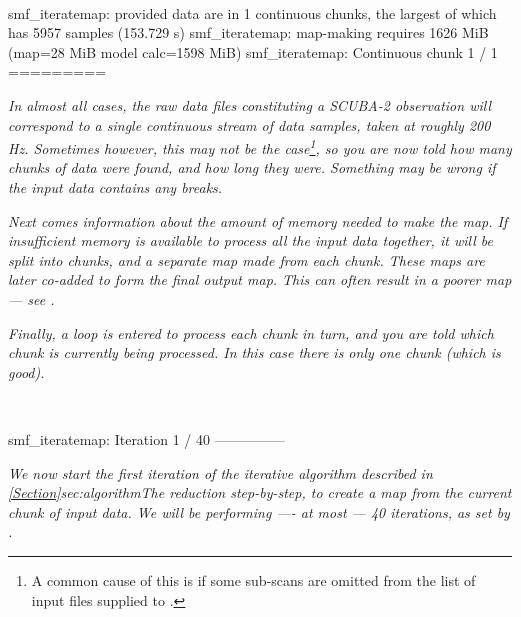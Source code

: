 ~
\begin{terminalv}
smf_iteratemap: provided data are in 1 continuous chunks, the largest of which
has 5957 samples (153.729 s)
smf_iteratemap: map-making requires 1626 MiB (map=28 MiB model calc=1598 MiB)
smf_iteratemap: Continuous chunk 1 / 1 =========
\end{terminalv}

\emph{In almost all cases, the raw data files constituting a SCUBA-2
observation will correspond to a single continuous stream of data
samples, taken at roughly 200 Hz. Sometimes however, this may not be the
case\footnote{A common cause of this is if some sub-scans are omitted
from the list of input files supplied to .}, so you are
now told how many chunks of data were found, and how long they were.
Something may be wrong if the input data contains any breaks.}

\emph{Next comes information about the amount of memory needed to make
the map. If insufficient memory is available to process all the input
data together, it will be split into chunks, and a separate map made from
each chunk. These maps are later co-added to form the final output map.
This can often result in a poorer map --- see 
{}.}

\emph{Finally, a loop is entered to process each chunk in turn, and
you are told which chunk is currently being processed. In this
case there is only one chunk (which is good).}

~
\begin{terminalv}
smf_iteratemap: Iteration 1 / 40 ---------------
\end{terminalv}

\emph{We now start the first iteration of the iterative algorithm described in
\cref{Section}{sec:algorithm}{The reduction step-by-step}, to create a
map from the current chunk of  input data. We will be performing ----
at most --- 40 iterations, as set by .}


